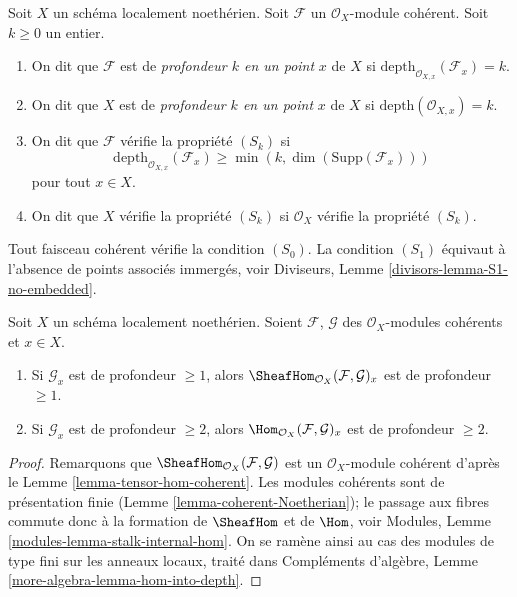 \begin{definition}
\label{definition-depth}
Soit $X$ un schéma localement noethérien.
Soit $\mathcal{F}$ un $\mathcal{O}_X$-module cohérent.
Soit $k \geq 0$ un entier.
\begin{enumerate}
\item On dit que $\mathcal{F}$ est de {\it profondeur $k$ en un point}
$x$ de $X$ si $\text{depth}_{\mathcal{O}_{X, x}}(\mathcal{F}_x) = k$.
\item On dit que $X$ est de {\it profondeur $k$ en un point} $x$ de $X$ si
$\text{depth}(\mathcal{O}_{X, x}) = k$.
\item On dit que $\mathcal{F}$ vérifie la propriété {\it $(S_k)$} si
$$
\text{depth}_{\mathcal{O}_{X, x}}(\mathcal{F}_x)
\geq \min(k, \dim(\text{Supp}(\mathcal{F}_x)))
$$
pour tout $x \in X$.
\item On dit que $X$ vérifie la propriété {\it $(S_k)$} si $\mathcal{O}_X$ vérifie
la propriété $(S_k)$.
\end{enumerate}
\end{definition}

\noindent
Tout faisceau cohérent vérifie la condition $(S_0)$.
La condition $(S_1)$ équivaut à l'absence de points associés
immergés, voir Diviseurs, Lemme \ref{divisors-lemma-S1-no-embedded}.

\begin{lemma}
\label{lemma-hom-into-depth}
Soit $X$ un schéma localement noethérien. Soient $\mathcal{F}$, $\mathcal{G}$
des $\mathcal{O}_X$-modules cohérents et $x \in X$.
\begin{enumerate}
\item Si $\mathcal{G}_x$ est de profondeur $\geq 1$, alors
$\SheafHom_{\mathcal{O}_X}(\mathcal{F}, \mathcal{G})_x$
est de profondeur $\geq 1$.
\item Si $\mathcal{G}_x$ est de profondeur $\geq 2$, alors
$\Hom_{\mathcal{O}_X}(\mathcal{F}, \mathcal{G})_x$ est de profondeur $\geq 2$.
\end{enumerate}
\end{lemma}

\begin{proof}
Remarquons que $\SheafHom_{\mathcal{O}_X}(\mathcal{F}, \mathcal{G})$ est
un $\mathcal{O}_X$-module cohérent d'après le Lemme \ref{lemma-tensor-hom-coherent}.
Les modules cohérents sont de présentation finie
(Lemme \ref{lemma-coherent-Noetherian}); le passage aux fibres commute donc
à la formation de $\SheafHom$ et de $\Hom$, voir
Modules, Lemme \ref{modules-lemma-stalk-internal-hom}.
On se ramène ainsi au cas des modules de type fini sur les anneaux
locaux, traité dans Compléments d'algèbre, Lemme \ref{more-algebra-lemma-hom-into-depth}.
\end{proof}

